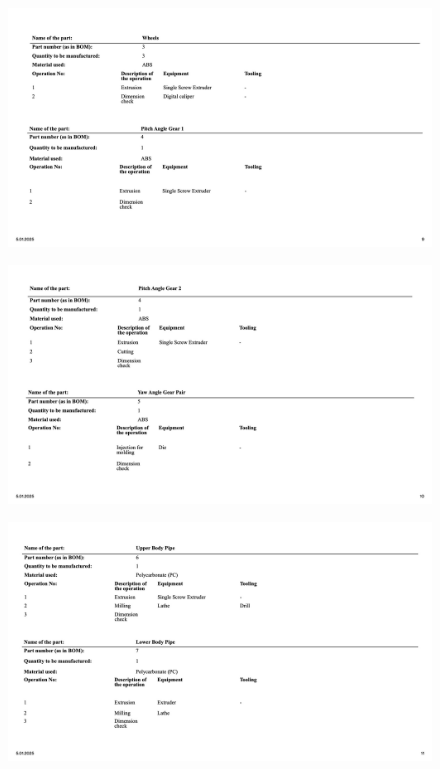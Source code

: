 \documentclass[12pt]{report}
\begin{document}
\begin{appendices}
\begin{figure}[H]
    \centering
    \includegraphics[width=\textwidth]{Slide9.jpeg} 
    \label{fig:route-sheet}
\end{figure}

\begin{figure}[H]
    \centering
    \includegraphics[width=\textwidth]{Slide10.jpeg} 
    \label{fig:route-sheet}
\end{figure}

\begin{figure}[H]
    \centering
    \includegraphics[width=\textwidth]{Slide11.jpeg} 
    \label{fig:route-sheet}
\end{figure}


\end{appendices}
\end{document}
